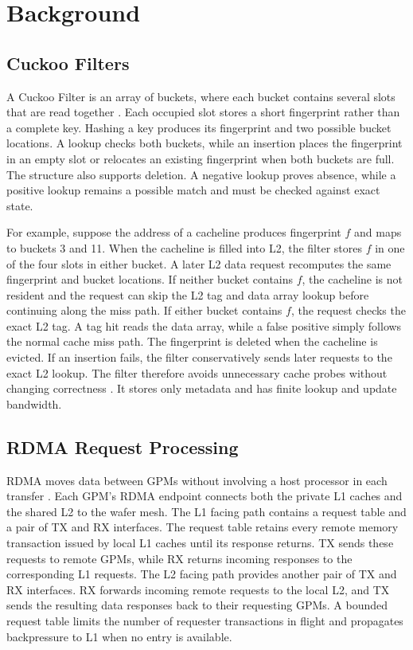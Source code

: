\section{Background}
\label{sec:background}

\subsection{Cuckoo Filters}
\label{sec:background-cuckoo}

A Cuckoo Filter is an array of buckets, where each bucket contains several
slots that are read together \cite{fan2014cuckoo}.  Each occupied slot stores a
short fingerprint rather than a complete key.  Hashing a key produces its
fingerprint and two possible bucket locations.  A lookup checks both buckets,
while an insertion places the fingerprint in an empty slot or relocates an
existing fingerprint when both buckets are full.  The structure also supports
deletion.  A negative lookup proves absence, while a positive lookup remains a
possible match and must be checked against exact state.

For example, suppose the address of a cacheline produces fingerprint $f$ and
maps to buckets 3 and 11.  When the cacheline is filled into L2, the filter
stores $f$ in one of the four slots in either bucket.  A later L2 data request
recomputes the same fingerprint and bucket locations.  If neither bucket
contains $f$, the cacheline is not resident and the request can skip the L2 tag
and data array lookup before continuing along the miss path.  If either bucket
contains $f$, the request checks the exact L2 tag.  A tag hit reads the data
array, while a false positive simply follows the normal cache miss path.  The
fingerprint is deleted when the cacheline is evicted.  If an insertion fails,
the filter conservatively sends later requests to the exact L2 lookup.  The
filter therefore avoids unnecessary cache probes without changing correctness
\cite{moshovos2001jetty}.  It stores only metadata and has finite lookup and
update bandwidth.

\subsection{RDMA Request Processing}
\label{sec:background-rdma}

RDMA moves data between GPMs without involving a host processor in each
transfer \cite{kalia2016design,wei2018deconstructing,mittal2018revisiting}.
Each GPM's RDMA endpoint connects both the private L1 caches and the shared L2
to the wafer mesh.  The L1 facing path contains a request table and a pair of
TX and RX interfaces.  The request table retains every remote memory
transaction issued by local L1 caches until its response returns.  TX sends
these requests to remote GPMs, while RX returns incoming responses to the
corresponding L1 requests.  The L2 facing path provides another pair of TX and
RX interfaces.  RX forwards incoming remote requests to the local L2, and TX
sends the resulting data responses back to their requesting GPMs.  A bounded
request table limits the number of requester transactions in flight and
propagates backpressure to L1 when no entry is available.

